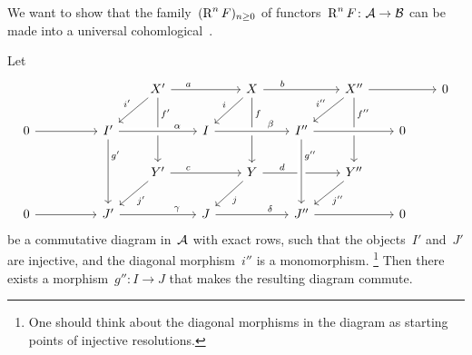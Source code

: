 \begin{goalnonum}
  We want to show that the family~$(\operatorname{R}^n F)_{n \geq 0}$ of functors~$\operatorname{R}^n F \colon \mathcal{A} \to \mathcal{B}$ can be made into a universal cohomlogical~{\deltafun}.
\end{goalnonum}


\begin{lemmanonum}
  Let
  \[
    \begin{tikzcd}[column sep = 2em]
        {}
      & {}
      & {}
      & X'
        \arrow{rr}[above, near start]{a}
        \arrow{dl}[above left]{i'}
        \arrow{dd}[right, near start]{f'}
      & {}
      & X
        \arrow{rr}[above, near start]{b}
        \arrow{dl}[above left]{i}
        \arrow{dd}[right, near start]{f}
      & {}
      & X''
        \arrow{rr}
        \arrow{dl}[above left]{i''}
        \arrow{dd}[right, near start]{f''}
      & {}
      & 0
      \\
        0
        \arrow{rr}
      & {}
      & I'
        \arrow{dd}[right, near start]{g'}
      & {}
      & I
        \arrow[from=ll, crossing over, "\alpha", near end]
      & {}
      & I''
        \arrow[from=ll, crossing over, "\beta", near end]
      & {}
      & 0
        \arrow[from=ll, crossing over]
      & {}
      \\
        {}
      & {}
      & {}
      & Y'
        \arrow{rr}[above, near start]{c}
        \arrow{dl}[below right]{j'}
      & {}
      & Y
        \arrow{rr}[above, near start]{d}
        \arrow{dl}[below right]{j}
      & {}
      & Y''
        \arrow{dl}[below right]{j''}
      & {}
      & {}
      \\
        0
        \arrow{rr}
      & {}
      & J'
        \arrow{rr}[above, near end]{\gamma}
      & {}
      & J
        \arrow{rr}[above, near end]{\delta}
      & {}
      & J''
        \arrow[from=uu, crossing over, "g''", near start]
        \arrow{rr}
      & {}
      & 0
      & {}
    \end{tikzcd}
  \]
  be a commutative diagram in~$\mathcal{A}$ with exact rows, such that the objects~$I'$ and~$J'$ are injective, and the diagonal morphism~$i''$ is a monomorphism.%
  \footnote{One should think about the diagonal morphisms in the diagram as starting points of injective resolutions.}
  Then there exists a morphism~$g'' \colon I \to J$ that makes the resulting diagram commute.
\end{lemmanonum}


